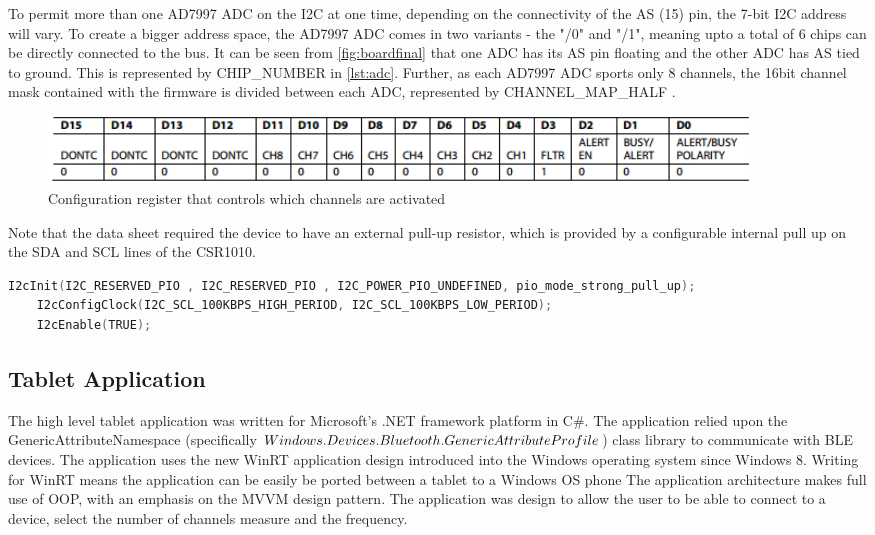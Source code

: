 \documentclass[]{article}
\begin{document}
To permit more than one AD7997 \ac{ADC} on the I2C at one time, depending on the connectivity of the AS (15) pin, the 7-bit I2C address will vary. To create a bigger address space, the AD7997 \ac{ADC} comes in two variants - the "/0" and "/1", meaning upto a total of 6 chips can be directly connected to the bus. It can be seen from \ref{fig:boardfinal} that one \ac{ADC} has its AS pin floating and the other \ac{ADC} has AS tied to ground. This is represented by CHIP\_NUMBER in \ref{lst:adc}. Further, as each AD7997 \ac{ADC} sports only 8 channels, the 16bit channel mask contained with the firmware is divided between each \ac{ADC}, represented by CHANNEL\_MAP\_HALF .


\begin{figure}[H]
	\begin{center}
		\includegraphics[width = 0.9\textwidth]{configreg}
	\end{center}
	\caption{Configuration register that controls which channels are activated}
	\label{fig:configreg}
\end{figure}


Note that the data sheet \cite{ad7997} required the device to have an external pull-up resistor, which is provided by a configurable internal pull up on the SDA and SCL lines of the CSR1010.


\begin{lstlisting}[language=C]
    I2cInit(I2C_RESERVED_PIO , I2C_RESERVED_PIO , I2C_POWER_PIO_UNDEFINED, pio_mode_strong_pull_up);
    I2cConfigClock(I2C_SCL_100KBPS_HIGH_PERIOD, I2C_SCL_100KBPS_LOW_PERIOD);
    I2cEnable(TRUE);
\end{lstlisting}













\subsection{Tablet Application}

The high level tablet application was written for Microsoft's .NET framework platform in C\#. The application relied upon the GenericAttributeNamespace (specifically $Windows.Devices.\\Bluetooth.GenericAttributeProfile$) class library to communicate with \ac{BLE} devices. The application uses the new WinRT application design introduced into the Windows operating system since Windows 8. Writing for WinRT means the application can be easily be ported between a tablet to a Windows OS phone The application architecture makes full use of \ac{OOP}, with an emphasis on the \ac{MVVM} design pattern. The application was design to allow the user to be able to connect to a device, select the number of channels measure and the frequency. 
\end{document}
